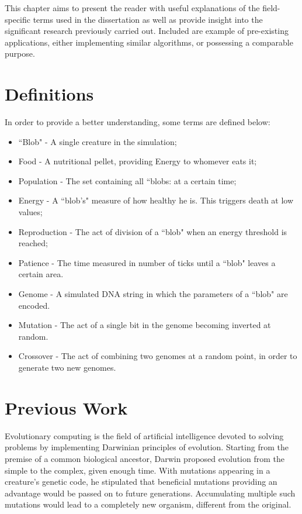 This chapter aims to present the reader with useful explanations of the field-specific terms used in the dissertation as well as provide insight into the significant research previously carried out. Included are example of pre-existing applications, either implementing similar algorithms, or possessing a comparable purpose.

\section{Definitions}

In order to provide a better understanding, some terms are defined below:

\begin{itemize}
	\item ``Blob" - A single creature in the simulation;
	\item Food - A nutritional pellet, providing Energy to whomever eats it;
	\item Population - The set containing all ``blobs: at a certain time;
	\item Energy - A ``blob's" measure of how healthy he is. This triggers death at low values;
	\item Reproduction - The act of division of a ``blob" when an energy threshold is reached;
	\item Patience - The time measured in number of ticks until a ``blob" leaves a certain area.
	\item Genome - A simulated DNA string in which the parameters of a ``blob" are encoded.
	\item Mutation - The act of a single bit in the genome becoming inverted at random.
	\item Crossover - The act of combining two genomes at a random point, in order to generate two new genomes.
\end{itemize}

\section{Previous Work} \label{prevwork}
Evolutionary computing is the field of artificial intelligence devoted to solving problems by implementing Darwinian principles of evolution. Starting from the premise of a common biological ancestor, Darwin proposed evolution from the simple to the complex, given enough time. With mutations appearing in a creature's genetic code, he stipulated that beneficial mutations providing an advantage would be passed on to future generations.\cite{darwinbook1859} Accumulating multiple such mutations would lead to a completely new organism, different from the original.

